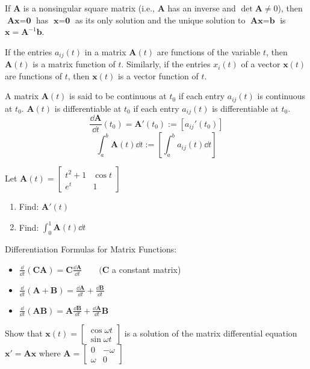 \documentclass[../diffeq.tex]{subfiles}
\begin{document}
If $\textbf{A}$ is a nonsingular square matrix (i.e., $\textbf{A}$ has an inverse and $\det \textbf{A}\neq 0$), then $\textbf{Ax}=\textbf{0}$ has $\textbf{x}=\textbf{0}$ as its only solution and the unique solution to 
$\textbf{Ax}=\textbf{b}$ is $\textbf{x}=\textbf{A}^{-1}\textbf{b}$.

If the entries $a_{ij}(t)$ in a matrix $\textbf{A}(t)$ are functions of the variable $t$, then $\textbf{A}(t)$ is a matrix function of $t$. Similarly, if the entries $x_i(t)$ of a vector 
$\textbf{x}(t)$ are functions of $t$, then $\textbf{x}(t)$ is a vector function of $t$.

A matrix $\textbf{A}(t)$ is said to be continuous at $t_0$ if each entry $a_{ij}(t)$ is continuous at $t_0$. $\textbf{A}(t)$ is differentiable at $t_0$ if each entry $a_{ij}(t)$ is differentiable at $t_0$.
\[ \frac{\dd \textbf{A}}{\dd t}(t_0)=\textbf{A}'(t_0):= [a_{ij}'(t_0)]\]
\[ \int_a^b \textbf{A}(t)\dd t := \left[\int_a^b a_{ij}(t)\dd t \right]\]

\ex Let $\textbf{A}(t)=\begin{bmatrix}
    t^2+1 & \cos t \\
    e^t & 1
\end{bmatrix}$
\begin{enumerate}
    \item Find: $\textbf{A}'(t)$
    \item Find: $\int_0^1 \textbf{A}(t)\dd t$
\end{enumerate}

Differentiation Formulas for Matrix Functions:
\begin{itemize}
    \item $\frac{\dd}{\dd t}(\textbf{CA})=\textbf{C}\frac{\dd \textbf{A}}{\dd t} \qquad (\textbf{C}$ a constant matrix)
    \item $\frac{\dd}{\dd t}(\textbf{A}+\textbf{B})=\frac{\dd \textbf{A}}{\dd t}+\frac{\dd \textbf{B}}{\dd t}$
    \item $\frac{\dd}{\dd t}(\textbf{AB})=\textbf{A}\frac{\dd \textbf{B}}{\dd t}+\frac{\dd \textbf{A}}{\dd t}\textbf{B}$
\end{itemize}

\ex Show that $\textbf{x}(t)=\begin{bmatrix}
    \cos \omega t\\
    \sin \omega t
\end{bmatrix}$ is a solution of the matrix differential equation $\textbf{x}'=\textbf{Ax}$ where $\textbf{A}=\begin{bmatrix}
    0 & -\omega \\
    \omega & 0
\end{bmatrix}$
\end{document}
